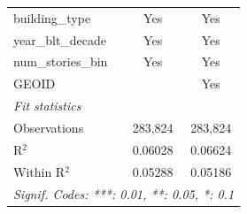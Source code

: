 \begin{tabular}{lcc}
   building\_type          & Yes            & Yes\\  
   year\_blt\_decade       & Yes            & Yes\\  
   num\_stories\_bin       & Yes            & Yes\\  
   GEOID                   &                & Yes\\  
   \midrule
   \emph{Fit statistics}\\
   Observations            & 283,824        & 283,824\\  
   R$^2$                   & 0.06028        & 0.06624\\  
   Within R$^2$            & 0.05288        & 0.05186\\  
   \midrule \midrule
   \multicolumn{3}{l}{\emph{Signif. Codes: ***: 0.01, **: 0.05, *: 0.1}}\\
\end{tabular}
\par\endgroup
\begingroup
\centering
